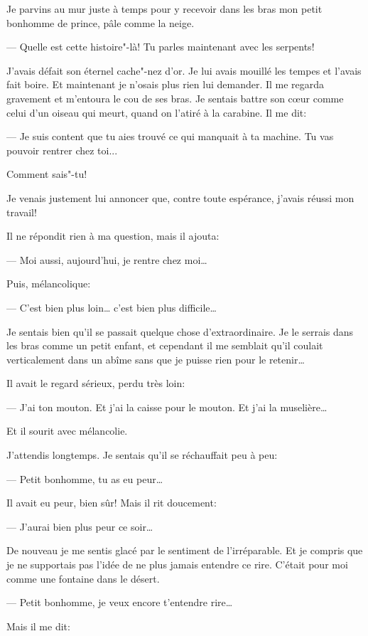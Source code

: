 Je parvins au mur juste à temps pour y recevoir dans les bras mon petit
bonhomme de prince, pâle comme la neige.

--- Quelle est cette histoire"-là! Tu parles maintenant avec les serpents!

J'avais défait son éternel cache"-nez d'or. Je lui avais mouillé les tempes
et l'avais fait boire. Et maintenant je n'osais plus rien lui demander. Il
me regarda gravement et m'entoura le cou de ses bras. Je sentais battre son
cœur comme celui d'un oiseau qui meurt, quand on l'atiré à la carabine. Il
me dit:

--- Je suis content que tu aies trouvé ce qui manquait à ta machine. Tu vas
pouvoir rentrer chez toi...

Comment sais"-tu!

Je venais justement lui annoncer que, contre toute espérance, j'avais réussi
mon travail!

Il ne répondit rien à ma question, mais il ajouta:

--- Moi aussi, aujourd'hui, je rentre chez moi\ldots{}

Puis, mélancolique:

--- C'est bien plus loin\ldots{} c'est bien plus difficile\ldots{}

Je sentais bien qu'il se passait quelque chose d'extraordinaire. Je le serrais
dans les bras comme un petit enfant, et cependant il me semblait qu'il coulait
verticalement dans un abîme sans que je puisse rien pour le retenir\ldots{}

Il avait le regard sérieux, perdu très loin:

--- J'ai ton mouton. Et j'ai la caisse pour le mouton. Et j'ai la muselière\ldots{}

Et il sourit avec mélancolie.

J'attendis longtemps. Je sentais qu'il se réchauffait peu à peu:

--- Petit bonhomme, tu as eu peur\ldots{}

Il avait eu peur, bien sûr! Mais il rit doucement:

--- J'aurai bien plus peur ce soir\ldots{}

De nouveau je me sentis glacé par le sentiment de l'irréparable. Et je compris
que je ne supportais pas l'idée de ne plus jamais entendre ce rire. C'était
pour moi comme une fontaine dans le désert.

--- Petit bonhomme, je veux encore t'entendre rire\ldots{}

Mais il me dit:

